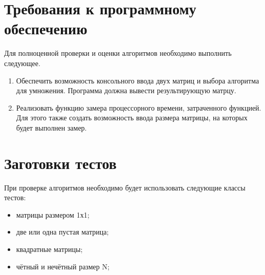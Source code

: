 \section{Требования к программному обеспечению}
Для полноценной проверки и оценки алгоритмов необходимо выполнить следующее.
\begin{enumerate}
	\item Обеспечить возможность консольного ввода двух матриц и выбора алгоритма для умножения. Программа должна вывести результирующую матрцу.
	\item Реализовать функцию замера процессорного времени, затраченного функцией. Для этого также создать возможность ввода размера матрицы, на которых будет выполнен замер.
\end{enumerate}

\section{Заготовки тестов}
При проверке алгоритмов необходимо будет использовать следующие классы тестов:
\begin{itemize}
	\item матрицы размером 1х1;
	\item две или одна пустая матрица;
	\item квадратные матрицы;
	\item чётный и нечётный размер N;
\end{itemize}



